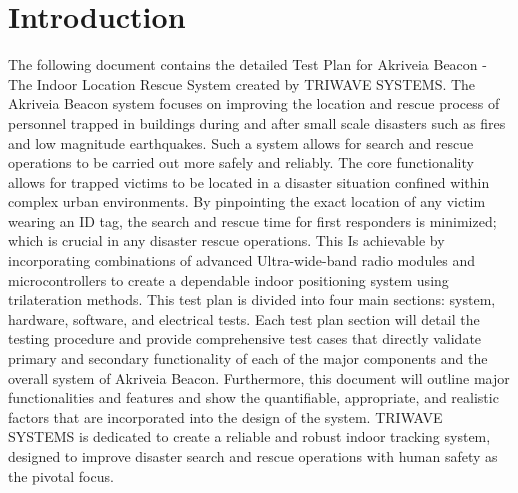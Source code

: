 

\setcounter{section}{0}
\section{Introduction}
\bigskip

The following document contains the detailed Test Plan for Akriveia Beacon - The Indoor Location Rescue System created by TRIWAVE SYSTEMS. The Akriveia Beacon system focuses on improving the location and rescue process of personnel trapped in buildings during and after small scale disasters such as fires and low magnitude earthquakes. 
\bigskip
Such a system allows for search and rescue operations to be carried out more safely and reliably. The core functionality allows for trapped victims to be located  in a disaster situation confined within complex urban environments.  By pinpointing the exact location of any victim wearing an ID tag, the search and rescue time for first responders is minimized; which is crucial in any disaster rescue operations. This Is achievable by incorporating combinations of advanced Ultra-wide-band radio modules and microcontrollers to create a dependable indoor positioning system using trilateration methods. 
\bigskip
This test plan is divided into four main sections: system, hardware, software, and electrical tests. Each test plan section will detail the testing procedure and provide comprehensive test cases that directly validate primary and secondary functionality of each of the major components and the overall system of Akriveia Beacon. Furthermore, this document will outline major functionalities and features and show the quantifiable, appropriate, and realistic factors that are incorporated into the design of the system.
\bigskip
TRIWAVE SYSTEMS is dedicated to create a reliable and robust indoor tracking system, designed to improve disaster search and rescue operations with human safety as the pivotal focus.
